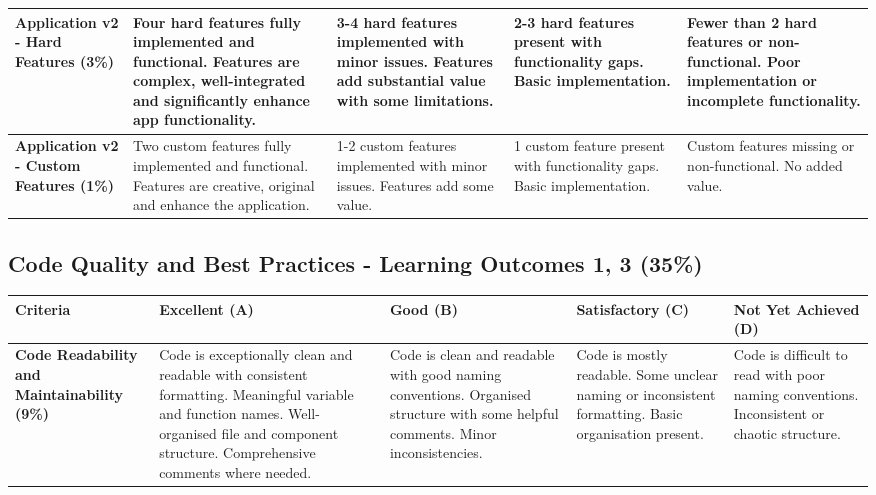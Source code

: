\documentclass{article}
\begin{document}
\begin{landscape}
\begin{tabular}{|p{5cm}|p{4cm}|p{4cm}|p{4cm}|p{4cm}|}
\textbf{Application v2 - Hard Features (3\%)} & 
Four hard features fully implemented and functional. Features are complex, well-integrated and significantly enhance app functionality. & 
3-4 hard features implemented with minor issues. Features add substantial value with some limitations. & 
2-3 hard features present with functionality gaps. Basic implementation. & 
Fewer than 2 hard features or non-functional. Poor implementation or incomplete functionality. \\ \hline

\textbf{Application v2 - Custom Features (1\%)} & 
Two custom features fully implemented and functional. Features are creative, original and enhance the application. & 
1-2 custom features implemented with minor issues. Features add some value. & 
1 custom feature present with functionality gaps. Basic implementation. & 
Custom features missing or non-functional. No added value. \\ \hline


\end{tabular}

\subsection*{Code Quality and Best Practices - Learning Outcomes 1, 3 (35\%)}

\begin{tabular}{|p{5cm}|p{4cm}|p{4cm}|p{4cm}|p{4cm}|}
\hline
\textbf{Criteria} & \textbf{Excellent (A)} & \textbf{Good (B)} & \textbf{Satisfactory (C)} & \textbf{Not Yet Achieved (D)} \\ \hline

\textbf{Code Readability and Maintainability (9\%)} & 
Code is exceptionally clean and readable with consistent formatting. Meaningful variable and function names. Well-organised file and component structure. Comprehensive comments where needed. & 
Code is clean and readable with good naming conventions. Organised structure with some helpful comments. Minor inconsistencies. & 
Code is mostly readable. Some unclear naming or inconsistent formatting. Basic organisation present. & 
Code is difficult to read with poor naming conventions. Inconsistent or chaotic structure. \\ \hline


\end{tabular}
\end{landscape}
\end{document}
